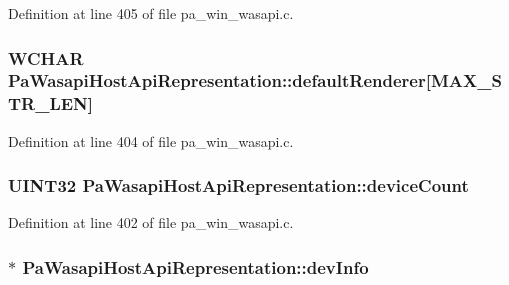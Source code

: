 Definition at line 405 of file pa\+\_\+win\+\_\+wasapi.\+c.

\subsubsection[{\texorpdfstring{default\+Renderer}{defaultRenderer}}]{\setlength{\rightskip}{0pt plus 5cm}W\+C\+H\+AR Pa\+Wasapi\+Host\+Api\+Representation\+::default\+Renderer\mbox{[}{\bf M\+A\+X\+\_\+\+S\+T\+R\+\_\+\+L\+EN}\mbox{]}}\hypertarget{struct_pa_wasapi_host_api_representation_a97f7bb4e7ccaab5658d3f2e339de7e4a}{}\label{struct_pa_wasapi_host_api_representation_a97f7bb4e7ccaab5658d3f2e339de7e4a}


Definition at line 404 of file pa\+\_\+win\+\_\+wasapi.\+c.

\subsubsection[{\texorpdfstring{device\+Count}{deviceCount}}]{\setlength{\rightskip}{0pt plus 5cm}U\+I\+N\+T32 Pa\+Wasapi\+Host\+Api\+Representation\+::device\+Count}\hypertarget{struct_pa_wasapi_host_api_representation_aa1e79d8886b9e0a504e3d3501b9bea18}{}\label{struct_pa_wasapi_host_api_representation_aa1e79d8886b9e0a504e3d3501b9bea18}


Definition at line 402 of file pa\+\_\+win\+\_\+wasapi.\+c.

\subsubsection[{\texorpdfstring{dev\+Info}{devInfo}}]{$\ast$ Pa\+Wasapi\+Host\+Api\+Representation\+::dev\+Info}\hypertarget{struct_pa_wasapi_host_api_representation_a69ec6c1449ce660d84a4d4d0653faf3e}{}\label{struct_pa_wasapi_host_api_representation_a69ec6c1449ce660d84a4d4d0653faf3e}


